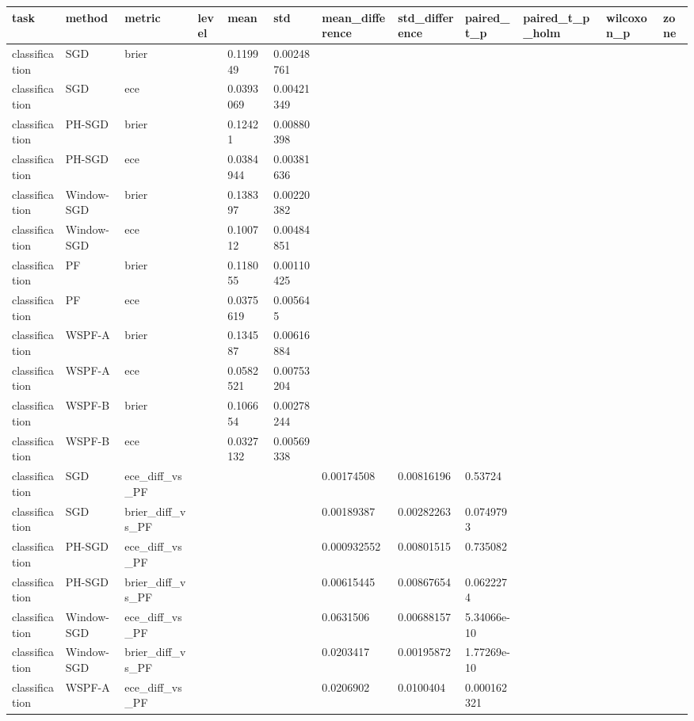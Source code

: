 \begin{tabular}{llllllllllll}
\hline
task & method & metric & level & mean & std & mean\_difference & std\_difference & paired\_t\_p & paired\_t\_p\_holm & wilcoxon\_p & zone \\
\hline
classification & SGD & brier &  & 0.119949 & 0.00248761 &  &  &  &  &  &  \\
classification & SGD & ece &  & 0.0393069 & 0.00421349 &  &  &  &  &  &  \\
classification & PH-SGD & brier &  & 0.12421 & 0.00880398 &  &  &  &  &  &  \\
classification & PH-SGD & ece &  & 0.0384944 & 0.00381636 &  &  &  &  &  &  \\
classification & Window-SGD & brier &  & 0.138397 & 0.00220382 &  &  &  &  &  &  \\
classification & Window-SGD & ece &  & 0.100712 & 0.00484851 &  &  &  &  &  &  \\
classification & PF & brier &  & 0.118055 & 0.00110425 &  &  &  &  &  &  \\
classification & PF & ece &  & 0.0375619 & 0.005645 &  &  &  &  &  &  \\
classification & WSPF-A & brier &  & 0.134587 & 0.00616884 &  &  &  &  &  &  \\
classification & WSPF-A & ece &  & 0.0582521 & 0.00753204 &  &  &  &  &  &  \\
classification & WSPF-B & brier &  & 0.106654 & 0.00278244 &  &  &  &  &  &  \\
classification & WSPF-B & ece &  & 0.0327132 & 0.00569338 &  &  &  &  &  &  \\
classification & SGD & ece\_diff\_vs\_PF &  &  &  & 0.00174508 & 0.00816196 & 0.53724 &  &  &  \\
classification & SGD & brier\_diff\_vs\_PF &  &  &  & 0.00189387 & 0.00282263 & 0.0749793 &  &  &  \\
classification & PH-SGD & ece\_diff\_vs\_PF &  &  &  & 0.000932552 & 0.00801515 & 0.735082 &  &  &  \\
classification & PH-SGD & brier\_diff\_vs\_PF &  &  &  & 0.00615445 & 0.00867654 & 0.0622274 &  &  &  \\
classification & Window-SGD & ece\_diff\_vs\_PF &  &  &  & 0.0631506 & 0.00688157 & 5.34066e-10 &  &  &  \\
classification & Window-SGD & brier\_diff\_vs\_PF &  &  &  & 0.0203417 & 0.00195872 & 1.77269e-10 &  &  &  \\
classification & WSPF-A & ece\_diff\_vs\_PF &  &  &  & 0.0206902 & 0.0100404 & 0.000162321 &  &  &  \\

\end{tabular}
